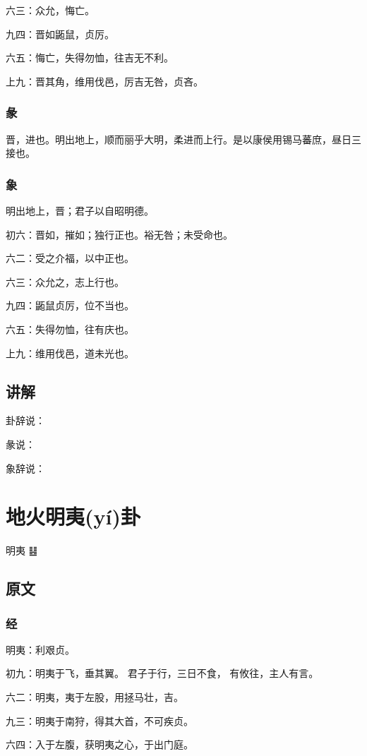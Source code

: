 \documentclass[12pt,oneside]{book}
\begin{document}
六三：众允，悔亡。

九四：晋如鼫鼠，贞厉。

六五：悔亡，失得勿恤，往吉无不利。

上九：晋其角，维用伐邑，厉吉无咎，贞吝。

\subsection{彖}
晋，进也。明出地上，顺而丽乎大明，柔进而上行。是以康侯用锡马蕃庶，昼日三接也。

\subsection{象}
明出地上，晋；君子以自昭明德。

初六：晋如，摧如；独行正也。裕无咎；未受命也。

六二：受之介福，以中正也。

六三：众允之，志上行也。

九四：鼫鼠贞厉，位不当也。

六五：失得勿恤，往有庆也。

上九：维用伐邑，道未光也。

\section{讲解}
卦辞说：

彖说：

象辞说：

\chapter{地火明夷(yí)卦}
明夷 {\Large ䷣}

\section{原文}

\subsection{经}
明夷：利艰贞。

初九：明夷于飞，垂其翼。 君子于行，三日不食， 有攸往，主人有言。

六二：明夷，夷于左股，用拯马壮，吉。

九三：明夷于南狩，得其大首，不可疾贞。

六四：入于左腹，获明夷之心，于出门庭。
\end{document}
